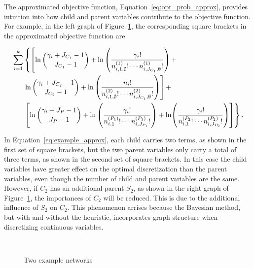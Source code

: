 The approximated objective function, Equation~\ref{eq:opt_prob_approx}, provides intuition into how child and parent variables contribute to the objective function.
For example, in the left graph of Figure~\ref{fig:example_networks}, the corresponding square brackets in the approximated objective function are

\begin{small}
  \begin{equation}
  \begin{aligned}
  \label{eq:example_approx}
   \sum_{i=1}^k & \left\lbrace   \left[ \ln{{\gamma_{i} + J_{C_1} - 1}\choose{J_{C_1}-1}} + \ln \left(  {{{\gamma_i}!} \over { {n^{(1)}_{i,1,\emptyset} !} \cdots {n^{(1)}_{i,J_{C_1},\emptyset} !}} }  \right)  +  \right. \right.\\
  & \left.  \ln{{\gamma_{i} + J_{C_2} - 1}\choose{J_{C_2}-1}} + \ln \left(  {{{n_i}!} \over { {n^{(2)}_{i,1,\emptyset} !} \cdots {n^{(2)}_{i,J_{C_1},\emptyset} !}} }  \right)  \right] + \\
  &  \left. \left[  \ln {{\gamma_{i} + J_P - 1}\choose{J_P-1}} +  \ln \left( { {{{\gamma}_i}!}\over{ {n^{(P_1)}_{i,1} !}\cdots {n^{(P_1)}_{i,J_{P_1}} !}}} \right) +\ln \paren{{ {{{\gamma}_i}!}\over{ {n^{(P_2}_{i,1} !}\cdots {n^{(P_2)}_{i,J_{P_2}} !}}} } \right] \right\rbrace \text{.}
  \end{aligned}
  \end{equation}
\end{small}

In Equation~\ref{eq:example_approx}, each child carries two terms, as shown in the first set of square brackets, but the two parent variables only carry a total of three terms, as shown in the second set of square brackets.
In this case the child variables have greater effect on the optimal discretization than the parent variables, even though the number of child and parent variables are the same.
However, if $C_2$ has an additional parent $S_2$, as shown in the right graph of Figure~\ref{fig:example_networks}, the importances of $C_2$ will be reduced.
This is due to the additional influence of $S_2$ on $C_2$.
This phenomenon arrises because the Bayesian method, but with and without the heuristic, incorporates graph structure when discretizing continuous variables.

\begin{figure}[ht]
  \centering
  \begin{tabular}{cc}
    
    \end{tabular}
    \hspace{5em}
    \begin{tabular}{cc}
    
  \end{tabular}
  \caption{Two example networks}
  \label{fig:example_networks}
\end{figure}


